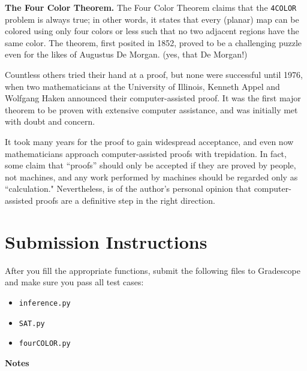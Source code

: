 \documentclass{article}
\begin{document}
    \begin{tcolorbox}[colback=green!10, phantom=\phantomsection\hypertarget{fct}]

        \textbf{The Four Color Theorem.}
        The Four Color Theorem claims that the \lstinline{4COLOR} problem is always true; in other words, it states that every (planar) map can be colored using only four colors or less such that no two adjacent regions have the same color. The theorem, first posited in 1852, proved to be a challenging puzzle even for the likes of Augustus De Morgan. (yes, that De Morgan!)

        \vspace{3mm}
        Countless others tried their hand at a proof, but none were successful until 1976, when two mathematicians at the University of Illinois, Kenneth Appel and Wolfgang Haken announced their computer-assisted proof.  It was the first major theorem to be proven with extensive computer assistance, and was initially met with doubt and concern.

        \vspace{3mm}
        It took many years for the proof to gain widespread acceptance, and even now mathematicians approach computer-assisted proofs with trepidation. In fact, some claim that ``proofs” should only be accepted if they are proved by people, not machines, and any work performed by machines should be regarded only as ``calculation." Nevertheless, is of the author's personal opinion that computer-assisted proofs are a definitive step in the right direction.
    \end{tcolorbox}

\section{Submission Instructions}
    After you fill the appropriate functions, submit the following files to Gradescope and make sure you pass all test cases:
    \begin{itemize}
        \item \lstinline{inference.py}
        \item \lstinline{SAT.py}
        \item \lstinline{fourCOLOR.py}
    \end{itemize}

    \vspace{3mm}
    \textbf{Notes}
\end{document}
